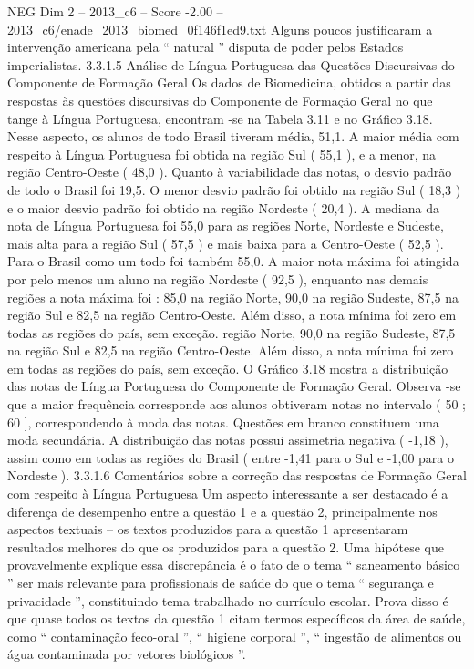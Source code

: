 \begin{textsample}{NEG Dim 2 – 2013\_c6 – Score -2.00 – 2013\_c6/enade\_2013\_biomed\_0f146f1ed9.txt}
Alguns poucos justificaram a intervenção americana pela “ natural ” disputa de poder pelos Estados imperialistas. 3.3.1.5 Análise de Língua Portuguesa das Questões Discursivas do Componente de Formação Geral Os dados de Biomedicina, obtidos a partir das respostas às questões discursivas do Componente de Formação Geral no que tange à Língua Portuguesa, encontram -se na Tabela 3.11 e no Gráfico 3.18.
Nesse aspecto, os alunos de todo Brasil tiveram média, 51,1.
A maior média com respeito à Língua Portuguesa foi obtida na região Sul ( 55,1 ), e a menor, na região Centro-Oeste ( 48,0 ).
Quanto à variabilidade das notas, o desvio padrão de todo o Brasil foi 19,5.
O menor desvio padrão foi obtido na região Sul ( 18,3 ) e o maior desvio padrão foi obtido na região Nordeste ( 20,4 ).
A mediana da nota de Língua Portuguesa foi 55,0 para as regiões Norte, Nordeste e Sudeste, mais alta para a região Sul ( 57,5 ) e mais baixa para a Centro-Oeste ( 52,5 ).
Para o Brasil como um todo foi também 55,0.
A maior nota máxima foi atingida por pelo menos um aluno na região Nordeste ( 92,5 ), enquanto nas demais regiões a nota máxima foi : 85,0 na região Norte, 90,0 na região Sudeste, 87,5 na região Sul e 82,5 na região Centro-Oeste.
Além disso, a nota mínima foi zero em todas as regiões do país, sem exceção. região Norte, 90,0 na região Sudeste, 87,5 na região Sul e 82,5 na região Centro-Oeste.
Além disso, a nota mínima foi zero em todas as regiões do país, sem exceção.
O Gráfico 3.18 mostra a distribuição das notas de Língua Portuguesa do Componente de Formação Geral.
Observa -se que a maior frequência corresponde aos alunos obtiveram notas no intervalo ( 50 ; 60 ], correspondendo à moda das notas.
Questões em branco constituem uma moda secundária.
A distribuição das notas possui assimetria negativa ( -1,18 ), assim como em todas as regiões do Brasil ( entre -1,41 para o Sul e -1,00 para o Nordeste ). 3.3.1.6 Comentários sobre a correção das respostas de Formação Geral com respeito à Língua Portuguesa Um aspecto interessante a ser destacado é a diferença de desempenho entre a questão 1 e a questão 2, principalmente nos aspectos textuais – os textos produzidos para a questão 1 apresentaram resultados melhores do que os produzidos para a questão 2.
Uma hipótese que provavelmente explique essa discrepância é o fato de o tema “ saneamento básico ” ser mais relevante para profissionais de saúde do que o tema “ segurança e privacidade ”, constituindo tema trabalhado no currículo escolar.
Prova disso é que quase todos os textos da questão 1 citam termos específicos da área de saúde, como “ contaminação feco-oral ”, “ higiene corporal ”, “ ingestão de alimentos ou água contaminada por vetores biológicos ”.

\end{textsample}

